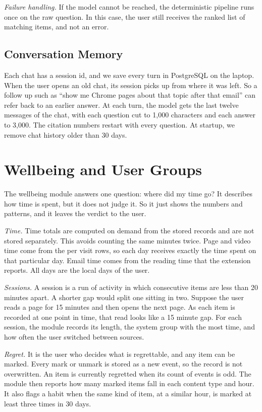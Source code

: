 \documentclass[conference]{IEEEtran}
\begin{document}
\textit{Failure handling.} If the model cannot be reached, the deterministic pipeline runs once on the raw question. In this case, the user still receives the ranked list of matching items, and not an error.

\subsection{Conversation Memory}
Each chat has a session id, and we save every turn in PostgreSQL on the laptop. When the user opens an old chat, its session picks up from where it was left. So a follow up such as ``show me Chrome pages about that topic after that email'' can refer back to an earlier answer. At each turn, the model gets the last twelve messages of the chat, with each question cut to 1,000 characters and each answer to 3,000. The citation numbers restart with every question. At startup, we remove chat history older than 30 days.

\section{Wellbeing and User Groups}\label{sec:wba}
The wellbeing module answers one question: where did my time go? It describes how time is spent, but it does not judge it. So it just shows the numbers and patterns, and it leaves the verdict to the user.

\textit{Time.} Time totals are computed on demand from the stored records and are not stored separately. This avoids counting the same minutes twice. Page and video time come from the per visit rows, so each day receives exactly the time spent on that particular day. Email time comes from the reading time that the extension reports. All days are the local days of the user.

\textit{Sessions.} A session is a run of activity in which consecutive items are less than 20 minutes apart. A shorter gap would split one sitting in two. Suppose the user reads a page for 15 minutes and then opens the next page. As each item is recorded at one point in time, that read looks like a 15 minute gap. For each session, the module records its length, the system group with the most time, and how often the user switched between sources.

\textit{Regret.} It is the user who decides what is regrettable, and any item can be marked. Every mark or unmark is stored as a new event, so the record is not overwritten. An item is currently regretted when its count of events is odd. The module then reports how many marked items fall in each content type and hour. It also flags a habit when the same kind of item, at a similar hour, is marked at least three times in 30 days.
\end{document}
